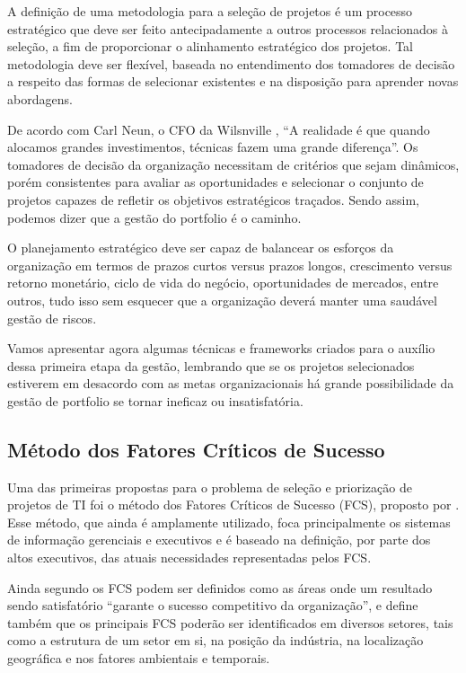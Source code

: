 \documentclass[12pt,a4paper,ruledheader,tocpage=prefix,floatnumber=continuous,pagestart=folhaderosto,font=times]{abnt}
\begin{document}
A definição de uma metodologia para a seleção de projetos é um processo estratégico que deve ser feito antecipadamente a outros processos relacionados à 
seleção, a fim de proporcionar o alinhamento estratégico dos projetos. Tal metodologia deve ser flexível, baseada no entendimento dos tomadores de 
decisão a respeito das formas de selecionar existentes e na disposição para aprender novas abordagens\cite{ARCHER1999}.

De acordo com Carl Neun, o CFO da Wilsnville \cite{JOHNSON2009}, “A realidade é que quando alocamos grandes investimentos, técnicas fazem uma grande 
diferença”. Os tomadores de decisão da organização necessitam de critérios que sejam dinâmicos, porém consistentes para avaliar as oportunidades e selecionar
o conjunto de projetos capazes de refletir os objetivos estratégicos traçados. Sendo assim, podemos dizer que a gestão do portfolio é o caminho.

O planejamento estratégico deve ser capaz de balancear os esforços da organização em termos de prazos curtos versus prazos longos, crescimento versus retorno
monetário, ciclo de vida do negócio, oportunidades de mercados, entre outros, tudo isso sem esquecer que a organização deverá manter uma saudável gestão
de riscos.

Vamos apresentar agora algumas técnicas e frameworks criados para o auxílio dessa primeira etapa da gestão, lembrando que se os projetos selecionados 
estiverem em desacordo com as metas organizacionais há grande possibilidade da gestão de portfolio se tornar ineficaz ou insatisfatória.

\subsection{Método dos Fatores Críticos de Sucesso}
Uma das primeiras propostas para o problema de seleção e priorização de projetos de TI foi o método dos Fatores Críticos de Sucesso (FCS),
proposto por  . Esse método, que ainda é amplamente utilizado, foca principalmente os sistemas de informação gerenciais
e executivos e é baseado na definição, por parte dos altos executivos, das atuais necessidades representadas pelos FCS.

Ainda segundo os FCS podem ser definidos como as áreas onde um resultado sendo satisfatório ``garante o sucesso competitivo da organização'',
e define também que os principais FCS poderão ser identificados em diversos setores, tais como a estrutura de um setor em si, na posição da indústria, 
na localização geográfica e nos fatores ambientais e temporais.
\end{document}
